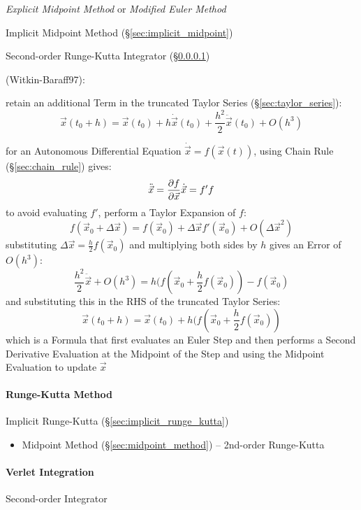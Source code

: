 \emph{Explicit Midpoint Method} or \emph{Modified Euler Method}

\fist Implicit Midpoint Method (\S\ref{sec:implicit_midpoint})

Second-order Runge-Kutta Integrator (\S\ref{sec:runge_kutta})

(Witkin-Baraff97):

retain an additional Term in the truncated Taylor Series
(\S\ref{sec:taylor_series}):
\[
  \vec{x}(t_0 + h) = \vec{x}(t_0) + h\dot{\vec{x}}(t_0) +
    \frac{h^2}{2}\ddot{\vec{x}}(t_0) + O(h^3)
\]

for an Autonomous Differential Equation $\dot{\vec{x}} = f(\vec{x}(t))$, using
Chain Rule (\S\ref{sec:chain_rule}) gives:
\[
  \ddot{\vec{x}} = \frac{\partial{f}}{\partial{\vec{x}}}\dot{\vec{x}} = f' f
\]
to avoid evaluating $f'$, perform a Taylor Expansion of $f$:
\[
  f(\vec{x}_0 + \Delta{\vec{x}}) =
    f(\vec{x}_0) + \Delta\vec{x}f'(\vec{x}_0) + O(\Delta\vec{x}^2)
\]
substituting $\Delta{\vec{x}} = \frac{h}{2} f(\vec{x}_0)$ and multiplying both
sides by $h$ gives an Error of $O(h^3)$:
\[
  \frac{h^2}{2}\ddot{\vec{x}} + O(h^3) =
    h(f(\vec{x}_0 + \frac{h}{2}f(\vec{x}_0)) - f(\vec{x}_0)
\]
and substituting this in the RHS of the truncated Taylor Series:
\[
  \vec{x}(t_0 + h) = \vec{x}(t_0) + h(f(\vec{x}_0 + \frac{h}{2}f(\vec{x}_0))
\]
which is a Formula that first evaluates an Euler Step and then performs a Second
Derivative Evaluation at the Midpoint of the Step and using the Midpoint
Evaluation to update $\vec{x}$



\paragraph{Runge-Kutta Method}\label{sec:runge_kutta}\hfill

\fist Implicit Runge-Kutta (\S\ref{sec:implicit_runge_kutta})

\begin{itemize}
  \item Midpoint Method (\S\ref{sec:midpoint_method}) -- 2nd-order Runge-Kutta
\end{itemize}



\paragraph{Verlet Integration}\label{sec:verlet_integration}\hfill

Second-order Integrator

